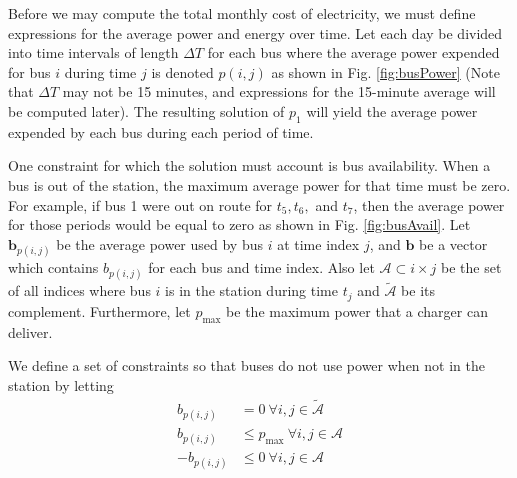 Before we may compute the total monthly cost of electricity, we must define expressions for the average power and energy over time.  Let each day be divided into time intervals of length $\Delta T$ for each bus where the average power expended for bus $i$ during time $j$ is denoted $p(i,j)$ as shown in Fig. \ref{fig:busPower} (Note that $\Delta T$ may not be 15 minutes, and expressions for the 15-minute average will be computed later). The resulting solution of $p_1$ will yield the average power expended by each bus during each period of time.
\par One constraint for which the solution must account is bus availability.  When a bus is out of the station, the maximum average power for that time must be zero. For example, if bus 1 were out on route for $t_5, t_6,$ and $t_7$, then the average power for those periods would be equal to zero as shown in Fig. \ref{fig:busAvail}. Let $\bm{b}_{p(i,j)}$ be the average power used by bus $i$ at time index $j$, and $\bm{b}$ be a vector which contains $b_{p(i,j)}$ for each bus and time index. Also let $\mathcal{A} \subset {i\times j}$  be the set of all indices where bus $i$ is in the station during time $t_j$ and $\tilde{\mathcal{A}}$ be its complement. Furthermore, let $p_{\text{max}}$ be the maximum power that a charger can deliver. 
\par We define a set of constraints so that buses do not use power when not in the station by letting
\begin{equation}\label{eqn:obj:power2}\begin{aligned}
	b_{p(i,j)} &= 0 \ \forall i,j \in \tilde{\mathcal{A}}  \\
	b_{p(i,j)} &\le p_{\text{max}} \ \forall i,j \in \mathcal{A} \\
	-b_{p(i,j)} &\le 0              \ \forall i,j \in \mathcal{A} 
\end{aligned}\end{equation}


